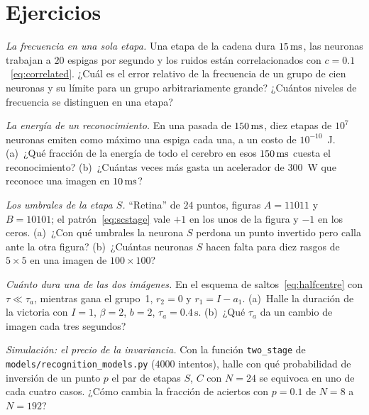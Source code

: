 \section{Ejercicios}

\begin{exercise}[\lvlA]
\label{ex:12:1}
\emph{La frecuencia en una sola etapa.} Una etapa de la cadena dura $15\,\text{ms}$, las neuronas trabajan a $20$ espigas por segundo y los ruidos están correlacionados con $c=0.1$~\eqref{eq:correlated}. ¿Cuál es el error relativo de la frecuencia de un grupo de cien neuronas y su límite para un grupo arbitrariamente grande? ¿Cuántos niveles de frecuencia se distinguen en una etapa?
\end{exercise}

\begin{exercise}[\lvlA]
\label{ex:12:2}
\emph{La energía de un reconocimiento.} En una pasada de $150\,\text{ms}$, diez etapas de $10^7$ neuronas emiten como máximo una espiga cada una, a un costo de $10^{-10}$~J. (a)~¿Qué fracción de la energía de todo el cerebro en esos $150\,\text{ms}$ cuesta el reconocimiento? (b)~¿Cuántas veces más gasta un acelerador de $300$~W que reconoce una imagen en $10\,\text{ms}$?
\end{exercise}

\begin{exercise}[\lvlB]
\label{ex:12:3}
\emph{Los umbrales de la etapa $S$.} “Retina” de $24$ puntos, figuras $A=11011$ y $B=10101$; el patrón~\eqref{eq:scstage} vale $+1$ en los unos de la figura y $-1$ en los ceros. (a)~¿Con qué umbrales la neurona $S$ perdona un punto invertido pero calla ante la otra figura? (b)~¿Cuántas neuronas $S$ hacen falta para diez rasgos de $5\times5$ en una imagen de $100\times100$?
\end{exercise}

\begin{exercise}[\lvlB]
\label{ex:12:4}
\emph{Cuánto dura una de las dos imágenes.} En el esquema de saltos~\eqref{eq:halfcentre} con $\tau\ll\tau_a$, mientras gana el grupo~1, $r_2=0$ y $r_1=I-a_1$. (a)~Halle la duración de la victoria con $I=1$, $\beta=2$, $b=2$, $\tau_a=0.4\,\text{s}$. (b)~¿Qué $\tau_a$ da un cambio de imagen cada tres segundos?
\end{exercise}

\begin{exercise}[\lvlB]
\label{ex:12:5}
\emph{Simulación: el precio de la invariancia.} Con la función \texttt{two\_stage} de \texttt{models/\allowbreak recognition\_models.py} ($4000$ intentos), halle con qué probabilidad de inversión de un punto $p$ el par de etapas $S$, $C$ con $N=24$ se equivoca en uno de cada cuatro casos. ¿Cómo cambia la fracción de aciertos con $p=0.1$ de $N=8$ a $N=192$?
\end{exercise}

